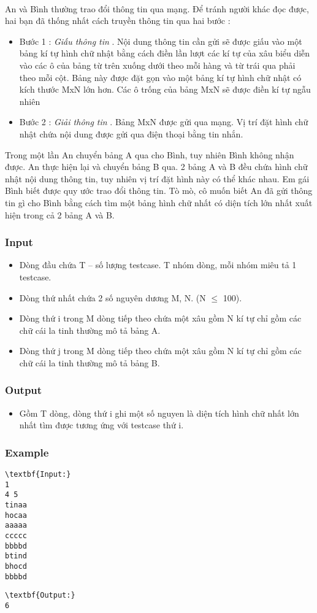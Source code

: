 

 

An và Bình thường trao đổi thông tin qua mạng. Để tránh người khác đọc được, hai bạn đã thống nhất cách truyền thông tin qua hai bước :
\begin{itemize}
	\item Bước 1 : \emph{ Giấu thông tin } . Nội dung thông tin cần gửi sẽ được giấu vào một bảng kí tự hình chữ nhật bằng cách điền lần lượt các kí tự của xâu biểu diễn vào các ô của bảng từ trên xuống dưới theo mỗi hàng và từ trái qua phải theo mỗi cột. Bảng này được đặt gọn vào một bảng kí tự hình chữ nhật có kích thước MxN lớn hơn. Các ô trống của bảng MxN sẽ được điền kí tự ngẫu nhiên
\end{itemize}
\begin{itemize}
	\item Bước 2 : \emph{ Giải thông tin } . Bảng MxN được gửi qua mạng. Vị trí đặt hình chữ nhật chứa nội dung được gửi qua điện thoại bằng tin nhắn.
\end{itemize}

Trong một lần An chuyển bảng A qua cho Bình, tuy nhiên Bình không nhận được. An thực hiện lại và chuyển bảng B qua. 2 bảng A và B đều chứa hình chữ nhật nội dung thông tin, tuy nhiên vị trí đặt hình này có thể khác nhau. Em gái Bình biết được quy ước trao đổi thông tin. Tò mò, cô muốn biết An đã gửi thông tin gì cho Bình bằng cách tìm một bảng hình chữ nhất có diện tích lớn nhất xuất hiện trong cả 2 bảng A và B.

\subsubsection{Input}
\begin{itemize}
	\item Dòng đầu chứa T – số lượng testcase. T nhóm dòng, mỗi nhóm miêu tả 1 testcase.
	\item Dòng thứ nhất chứa 2 số nguyên dương M, N. (N  $\le$  100).
	\item Dòng thứ i trong M dòng tiếp theo chứa một xâu gồm N kí tự chỉ gồm các chữ cái la tinh thường mô tả bảng A.
	\item Dòng thứ j trong M dòng tiếp theo chứa một xâu gồm N kí tự chỉ gồm các chữ cái la tinh thường mô tả bảng B.
\end{itemize}

\subsubsection{Output}
\begin{itemize}
	\item Gồm T dòng, dòng thứ i ghi một số nguyen là diện tích hình chữ nhất lớn nhất tìm được tương ứng với testcase thứ i.
\end{itemize}

\subsubsection{Example}
\begin{verbatim}
\textbf{Input:}
1
4 5
tinaa
hocaa
aaaaa
ccccc
bbbbd
btind
bhocd
bbbbd\end{verbatim}
\begin{verbatim}
\textbf{Output:}
6\end{verbatim}
